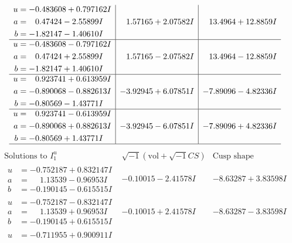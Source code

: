 \documentclass[1p]{elsarticle_modified}
\theoremstyle{definition}
\newcommand{\I}{\sqrt{-1}}
\begin{document}
$$\begin{array}{c|c|c}
\begin{aligned}
u &= -0.483608 + 0.797162 I \\
a &= \phantom{-}0.47424 - 2.55899 I \\
b &= -1.82147 - 1.40610 I\end{aligned}
 & \phantom{-}1.57165 + 2.07582 I & \phantom{-}13.4964 + 12.8859 I \\ \hline\begin{aligned}
u &= -0.483608 - 0.797162 I \\
a &= \phantom{-}0.47424 + 2.55899 I \\
b &= -1.82147 + 1.40610 I\end{aligned}
 & \phantom{-}1.57165 - 2.07582 I & \phantom{-}13.4964 - 12.8859 I \\ \hline\begin{aligned}
u &= \phantom{-}0.923741 + 0.613959 I \\
a &= -0.890068 - 0.882613 I \\
b &= -0.80569 - 1.43771 I\end{aligned}
 & -3.92945 + 6.07851 I & -7.89096 - 4.82336 I \\ \hline\begin{aligned}
u &= \phantom{-}0.923741 - 0.613959 I \\
a &= -0.890068 + 0.882613 I \\
b &= -0.80569 + 1.43771 I\end{aligned}
 & -3.92945 - 6.07851 I & -7.89096 + 4.82336 I\\
 \hline 
 \end{array}$$\newpage$$\begin{array}{c|c|c}  
\text{Solutions to }I^u_{1}& \I (\text{vol} + \sqrt{-1}CS) & \text{Cusp shape}\\
 \hline 
\begin{aligned}
u &= -0.752187 + 0.832147 I \\
a &= \phantom{-}1.13539 - 0.96953 I \\
b &= -0.190145 - 0.615515 I\end{aligned}
 & -0.10015 - 2.41578 I & -8.63287 + 3.83598 I \\ \hline\begin{aligned}
u &= -0.752187 - 0.832147 I \\
a &= \phantom{-}1.13539 + 0.96953 I \\
b &= -0.190145 + 0.615515 I\end{aligned}
 & -0.10015 + 2.41578 I & -8.63287 - 3.83598 I \\ \hline\begin{aligned}
u &= -0.711955 + 0.900911 I \\

\end{aligned}
\end{array}$$
\end{document}
